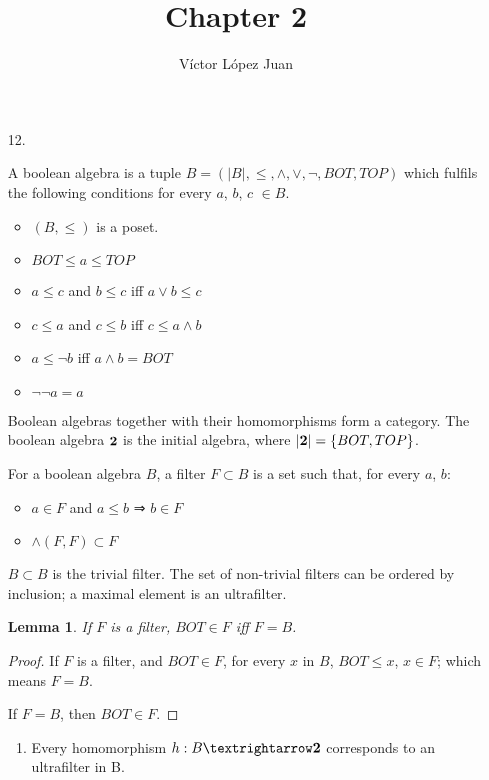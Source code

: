 \documentclass{article}
\author{Víctor López Juan}
\title{Chapter 2}
\newtheorem{lemma}{Lemma}
\begin{document}
\begin{enumerate}
  \item[12.]

    A boolean algebra is a tuple $B = (\vert B \vert, ≤, ∧, ∨, ¬, BOT, TOP)$ which
    fulfils the following conditions for every $a$, $b$, $c$ $ ∈ B$.
    \begin{itemize}
      \item $(B, ≤)$ is a poset.
      \item $BOT ≤ a ≤ TOP$
      \item $a ≤ c$ and $b ≤ c$ iff $a ∨ b ≤ c$
      \item $c ≤ a$ and $c ≤ b$ iff $c ≤ a ∧ b$
      \item $a ≤ ¬b$ iff $a ∧ b = BOT$
      \item $¬¬a = a$
    \end{itemize}

    Boolean algebras together with their homomorphisms form a category.
    The boolean algebra $\text{\bf 2}$ is the initial algebra, where
    $\vert \text{\bf 2} \vert = \{BOT, TOP\}$.


    For a boolean algebra $B$, a filter $F \subset B$ is a set such
    that, for every $a$, $b$:

    \begin{itemize}
      \item $a \in F$ and $a ≤ b$ ⇒ $b ∈ F$
      \item $∧(F,F) \subset F$
    \end{itemize}

    $B \subset B$ is the trivial filter. 
    The set of non-trivial filters can be ordered by inclusion; a maximal element
    is an ultrafilter.
    
     \begin{lemma}\label{lem:bot}
       If $F$ is a filter, $BOT \in F$ iff $F = B$.
     \end{lemma}
     
     \begin{proof}
           If $F$ is a filter, and $BOT ∈ F$, for every $x$ in $B$, $BOT ≤ x$,
           $x ∈ F$; which means $F = B$.

           If $F = B$, then $BOT \in F$.
     \end{proof}

   \begin{enumerate}
     \item Every homomorphism $h : B → \text{\bf 2}$ corresponds to an
       ultrafilter in B.


\end{enumerate}
\end{enumerate}
\end{document}

